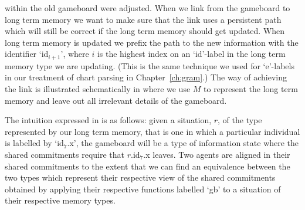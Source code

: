 within the old gameboard were adjusted.  When we link from the
gameboard to long term memory we want to make sure that the link uses
a persistent path which will still be correct if the long term memory
should get updated.  When long term memory is updated we prefix the
path to the new information with 
the identifier `id$_{i+1}$', where $i$ is the highest index on an
`id'-label in the long term memory type we are updating.  (This is the
same technique we used for `e'-labels in our treatment of chart parsing
in Chapter~\ref{ch:gram}.) The way of achieving the link is
illustrated schematically in \nexteg{} where we use $M$ to represent
the long term memory \preveg{} and leave out all irrelevant details of
the gameboard.
\begin{ex} 
\label{ex:tisSamLeaves}
\end{ex} 
The intuition expressed in \preveg{} is as follows:  given a
situation, $r$,
of the type represented by our long term memory, that is one in which
a particular individual is labelled by `id$_7$.x', the gameboard will
be a type of information state where the shared commitments require that
$r$.id$_7$.x leaves.  Two agents are aligned in their shared
commitments to the extent that we can find an equivalence between the
two types which represent their respective view of the shared
commitments obtained by applying their respective functions labelled `gb' to a
situation of their respective memory types. 

